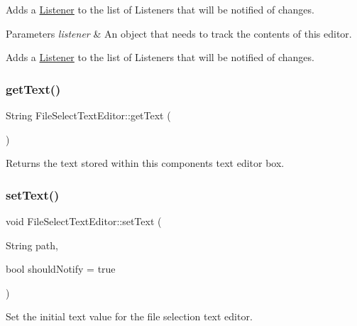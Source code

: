 Adds a \mbox{\hyperlink{classFileSelectTextEditor_1_1Listener}{Listener}} to the list of Listeners that will be notified of changes.


\begin{DoxyParams}{Parameters}
{\em listener} & An object that needs to track the contents of this editor.\\
\hline
\end{DoxyParams}
Adds a \mbox{\hyperlink{classFileSelectTextEditor_1_1Listener}{Listener}} to the list of Listeners that will be notified of changes. \mbox{\label{classFileSelectTextEditor_a759f2ef70d2aa46c5e7a53bd6574067a}} 
\subsubsection{\texorpdfstring{get\+Text()}{getText()}}
{\footnotesize\ttfamily String File\+Select\+Text\+Editor\+::get\+Text (\begin{DoxyParamCaption}{ }\end{DoxyParamCaption})}

\begin{DoxyReturn}{Returns}
the text stored within this component\textquotesingle{}s text editor box. 
\end{DoxyReturn}
\mbox{\label{classFileSelectTextEditor_a902fd5a435b471bb2f0360e4d764d9c4}} 
\subsubsection{\texorpdfstring{set\+Text()}{setText()}}
{\footnotesize\ttfamily void File\+Select\+Text\+Editor\+::set\+Text (\begin{DoxyParamCaption}\item[{String}]{path,  }\item[{bool}]{should\+Notify = {\ttfamily true} }\end{DoxyParamCaption})}

Set the initial text value for the file selection text editor.


